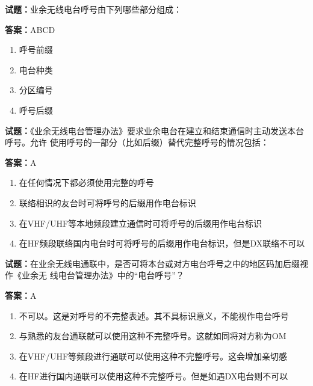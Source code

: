 \documentclass{ctexbook}
\begin{document}
\textbf{试题：}业余无线电台呼号由下列哪些部分组成： 

\textbf{答案：}ABCD 

\begin{enumerate}[leftmargin=3em]
  \item 呼号前缀 

  \item 电台种类 

  \item 分区编号 

  \item 呼号后缀 

\end{enumerate}





\vspace{1em}

\textbf{试题：}《业余无线电台管理办法》要求业余电台在建立和结束通信时主动发送本台呼号。允许
使用呼号的一部分（比如后缀）替代完整呼号的情况包括： 

\textbf{答案：}A 

\begin{enumerate}[leftmargin=3em]
  \item 在任何情况下都必须使用完整的呼号 

  \item 联络相识的友台时可将呼号的后缀用作电台标识 

  \item 在VHF/UHF等本地频段建立通信时可将呼号的后缀用作电台标识 

  \item 在HF频段联络国内电台时可将呼号的后缀用作电台标识，但是DX联络不可以 

\end{enumerate}






\vspace{1em}

\textbf{试题：}在业余无线电通联中，是否可将本台或对方电台呼号之中的地区码加后缀视作《业余无
线电台管理办法》中的“电台呼号”？ 

\textbf{答案：}A 

\begin{enumerate}[leftmargin=3em]
  \item 不可以。这是对呼号的不完整表述。其不具标识意义，不能视作电台呼号 

  \item 与熟悉的友台通联就可以使用这种不完整呼号。这就如同将对方称为OM 

  \item 在VHF/UHF等频段进行通联可以使用这种不完整呼号。这会增加亲切感 

  \item 在HF进行国内通联可以使用这种不完整呼号。但是如遇DX电台则不可以 

\end{enumerate}
\end{document}
